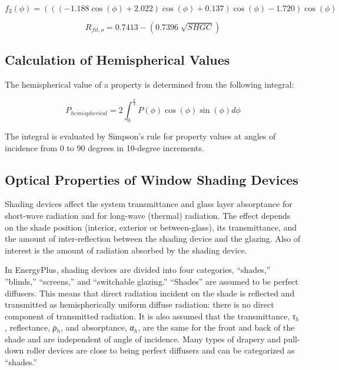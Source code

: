\begin{equation}
{f_2}\left( \phi  \right) = \left( {\left( {\left( { - 1.188\cos \left( \phi  \right) + 2.022} \right)\cos \left( \phi  \right) + 0.137} \right)\cos \left( \phi  \right) - 1.720} \right)\cos \left( \phi  \right)
\end{equation}

\begin{equation}
{R_{fit,o}} = 0.7413 - \left( {0.7396\;\sqrt {SHGC} } \right)
\end{equation}

\subsection{Calculation of Hemispherical Values}\label{calculation-of-hemispherical-values}

The hemispherical value of a property is determined from the following integral:

\begin{equation}
{P_{hemispherical}} = 2\int_0^{\frac{\pi }{2}} {P(\phi )\cos (\phi )\sin (\phi )d\phi }
\end{equation}

The integral is evaluated by Simpson's rule for property values at angles of incidence from 0 to 90 degrees in 10-degree increments.

\subsection{Optical Properties of Window Shading Devices}\label{optical-properties-of-window-shading-devices}

Shading devices affect the system transmittance and glass layer absorptance for short-wave radiation and for long-wave (thermal) radiation. The effect depends on the shade position (interior, exterior or between-glass), its transmittance, and the amount of inter-reflection between the shading device and the glazing. Also of interest is the amount of radiation absorbed by the shading device.

In EnergyPlus, shading devices are divided into four categories, ``shades,'' ''blinds,'' ``screens,'' and ``switchable glazing.'' ``Shades'' are assumed to be perfect diffusers. This means that direct radiation incident on the shade is reflected and transmitted as hemispherically uniform diffuse radiation: there is no direct component of transmitted radiation. It is also assumed that the transmittance, \emph{τ\(_{h}\)}, reflectance, \emph{ρ\(_{h}\)}, and absorptance, \emph{α\(_{h}\)}, are the same for the front and back of the shade and are independent of angle of incidence. Many types of drapery and pull-down roller devices are close to being perfect diffusers and can be categorized as ``shades.''

